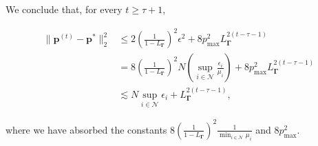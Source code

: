 \documentclass{article} %
\newtheorem{proposition}[theorem]{Proposition}
\begin{document}
We conclude that, for every $t \geq \tau+1$,

\begin{align*}
\|\mathbf{p}^{(t)}-\mathbf{p}^*\|_2^2 &\leq 2\left(\tfrac{1}{1-L_{\boldsymbol{\Gamma}}}\right)^2\epsilon^2+8p^2_{\max}L^{2(t-\tau-1)}_{\boldsymbol{\Gamma}} \\
&= 8\left(\tfrac{1}{1-L_{\boldsymbol{\Gamma}}}\right)^2N \left(\sup_{i \in \mathcal{N}}\frac{\epsilon_i}{\mu_i}\right)+8p^2_{\max}L^{2(t-\tau-1)}_{\boldsymbol{\Gamma}}\\
&\lesssim  N\sup_{i \in \mathcal{N}}\epsilon_i + L^{2(t-\tau-1)}_{\boldsymbol{\Gamma}},
\end{align*}

where we have absorbed the constants $8\left(\tfrac{1}{1-L_{\boldsymbol{\Gamma}}}\right)^2\frac{1}{\min_{i\in \mathcal{N}}\mu_i}$ and $8p^2_{\max}$.




\end{document}
